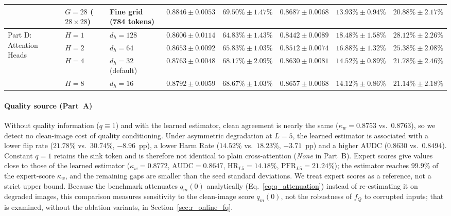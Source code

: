 \documentclass[final,5p,times,twocolumn,authoryear]{elsarticle}
\theoremstyle{plain}
\theoremstyle{remark}
\begin{document}
\begin{table}[!tb]
{\begin{tabular}{llp{4.6cm}ccccc}
  & $G = 28$ ($28 \times 28$) & Fine grid (784 tokens)                                          & $\mathbf{0.8846 \pm 0.0053}$ & $\mathbf{69.50\% \pm 1.47\%}$ & $\mathbf{0.8687 \pm 0.0068}$ & $\mathbf{13.93\% \pm 0.94\%}$ & $\mathbf{20.88\% \pm 2.17\%}$ \\
\midrule
\multirow{4}{*}{Part D: Attention Heads}
  & $H = 1$                   & $d_h = 128$                                                     & $0.8606 \pm 0.0114$ & $64.83\% \pm 1.43\%$ & $0.8442 \pm 0.0089$ & $18.48\% \pm 1.58\%$ & $28.12\% \pm 2.26\%$ \\
  & $H = 2$                   & $d_h = 64$                                                      & $0.8653 \pm 0.0092$ & $65.83\% \pm 1.03\%$ & $0.8512 \pm 0.0074$ & $16.88\% \pm 1.32\%$ & $25.38\% \pm 2.08\%$ \\
  & $H = 4$                   & $d_h = 32$ (default)                                            & $0.8763 \pm 0.0048$ & $68.17\% \pm 2.09\%$ & $0.8630 \pm 0.0081$ & $14.52\% \pm 0.89\%$ & $21.78\% \pm 2.46\%$ \\
  & $H = 8$                   & $d_h = 16$                                                      & $\mathbf{0.8792 \pm 0.0059}$ & $\mathbf{68.67\% \pm 1.03\%}$ & $\mathbf{0.8657 \pm 0.0068}$ & $\mathbf{14.12\% \pm 0.86\%}$ & $\mathbf{21.14\% \pm 2.18\%}$ \\
\bottomrule
\end{tabular}}
\end{table}

\paragraph{Quality source (Part~A)} Without quality information ($q\equiv1$) and with the learned estimator, clean agreement is nearly the same ($\kappa_w = 0.8753$ vs.\ $0.8763$), so we detect no clean-image cost of quality conditioning. Under asymmetric degradation at $L=5$, the learned estimator is associated with a lower flip rate ($21.78\%$ vs.\ $30.74\%$, $-8.96$~pp), a lower Harm Rate ($14.52\%$ vs.\ $18.23\%$, $-3.71$~pp) and a higher AUDC ($0.8630$ vs.\ $0.8494$). Constant $q=1$ retains the sink token and is therefore not identical to plain cross-attention (\emph{None} in Part~B). Expert scores give values close to those of the learned estimator ($\kappa_w = 0.8772$, $\text{AUDC} = 0.8647$, $\text{HR}_{L5} = 14.18\%$, $\text{PFR}_{L5} = 21.24\%$); the estimator reaches $99.9\%$ of the expert-score $\kappa_w$, and the remaining gaps are smaller than the seed standard deviations. We treat expert scores as a reference, not a strict upper bound. Because the benchmark attenuates $q_m(0)$ analytically (Eq.~\eqref{eq:q_attenuation}) instead of re-estimating it on degraded images, this comparison measures sensitivity to the clean-image score $q_m(0)$, not the robustness of $f_Q$ to corrupted inputs; that is examined, without the ablation variants, in Section~\ref{sec:r_online_fq}.
\end{document}
